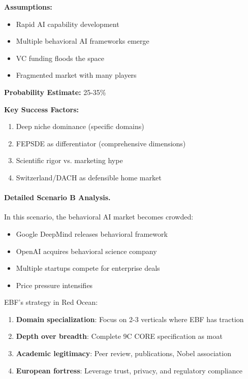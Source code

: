 \begin{tcolorbox}[colback=red!5!white, colframe=red!75!black,
    title=Scenario B: Red Ocean]

\textbf{Assumptions:}
\begin{itemize}[nosep]
\item Rapid AI capability development
\item Multiple behavioral AI frameworks emerge
\item VC funding floods the space
\item Fragmented market with many players
\end{itemize}

\textbf{Probability Estimate:} 25-35\%

\textbf{Key Success Factors:}
\begin{enumerate}[nosep]
\item Deep niche dominance (specific domains)
\item FEPSDE as differentiator (comprehensive dimensions)
\item Scientific rigor vs. marketing hype
\item Switzerland/DACH as defensible home market
\end{enumerate}

\end{tcolorbox}

\paragraph{Detailed Scenario B Analysis.}

In this scenario, the behavioral AI market becomes crowded:

\begin{itemize}
\item Google DeepMind releases behavioral framework
\item OpenAI acquires behavioral science company
\item Multiple startups compete for enterprise deals
\item Price pressure intensifies
\end{itemize}

EBF's strategy in Red Ocean:
\begin{enumerate}
\item \textbf{Domain specialization}: Focus on 2-3 verticals where EBF has traction
\item \textbf{Depth over breadth}: Complete 9C CORE specification as moat
\item \textbf{Academic legitimacy}: Peer review, publications, Nobel association
\item \textbf{European fortress}: Leverage trust, privacy, and regulatory compliance
\end{enumerate}


